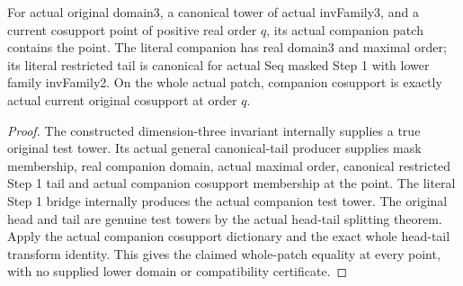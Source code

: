 \begin{lemma}
\label{hir:general-three-actual-companion-domain-dictionary}
\leanok
For actual original domain3, a canonical tower of actual invFamily3,
and a current cosupport point of positive real order $q$, its actual
companion patch contains the point. The literal companion has real
domain3 and maximal order; its literal restricted tail is canonical
for actual Seq masked Step 1 with lower family invFamily2. On the
whole actual patch, companion cosupport is exactly actual current
original cosupport at order $q$.
\end{lemma}
\begin{proof}
The constructed dimension-three invariant internally supplies a true
original test tower. Its actual general canonical-tail producer supplies
mask membership, real companion domain, actual maximal order, canonical
restricted Step 1 tail and actual companion cosupport membership at the
point. The literal Step 1 bridge internally produces the actual companion
test tower. The original head and tail are genuine test towers by the
actual head-tail splitting theorem. Apply the actual companion cosupport
dictionary and the exact whole head-tail transform identity. This gives
the claimed whole-patch equality at every point, with no supplied lower
domain or compatibility certificate.
\end{proof}

